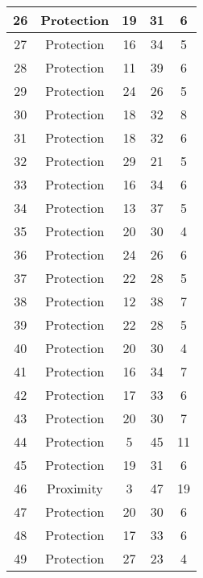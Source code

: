 \documentclass[results.tex]{subfiles}
\begin{document}
\begin{center}
\begin{tabular}{| c || c | c | c | c |}
    \hline
    26 & Protection & 19 & 31 & 6 \\ 
    \hline
    27 & Protection & 16 & 34 & 5 \\ 
    \hline
    28 & Protection & 11 & 39 & 6 \\ 
    \hline
    29 & Protection & 24 & 26 & 5 \\ 
    \hline
    30 & Protection & 18 & 32 & 8 \\ 
    \hline
    31 & Protection & 18 & 32 & 6 \\ 
    \hline
    32 & Protection & 29 & 21 & 5 \\ 
    \hline
    33 & Protection & 16 & 34 & 6 \\ 
    \hline
    34 & Protection & 13 & 37 & 5 \\ 
    \hline
    35 & Protection & 20 & 30 & 4 \\ 
    \hline
    36 & Protection & 24 & 26 & 6 \\ 
    \hline
    37 & Protection & 22 & 28 & 5 \\ 
    \hline
    38 & Protection & 12 & 38 & 7 \\ 
    \hline
    39 & Protection & 22 & 28 & 5 \\ 
    \hline
    40 & Protection & 20 & 30 & 4 \\ 
    \hline
    41 & Protection & 16 & 34 & 7 \\ 
    \hline
    42 & Protection & 17 & 33 & 6 \\ 
    \hline
    43 & Protection & 20 & 30 & 7 \\ 
    \hline
    44 & Protection & 5 & 45 & 11 \\ 
    \hline
    45 & Protection & 19 & 31 & 6 \\ 
    \hline
    46 & Proximity & 3 & 47 & 19 \\ 
    \hline
    47 & Protection & 20 & 30 & 6 \\ 
    \hline
    48 & Protection & 17 & 33 & 6 \\ 
    \hline
    49 & Protection & 27 & 23 & 4 \\ 
    \hline   \end{tabular}
\end{center}
\end{document}
